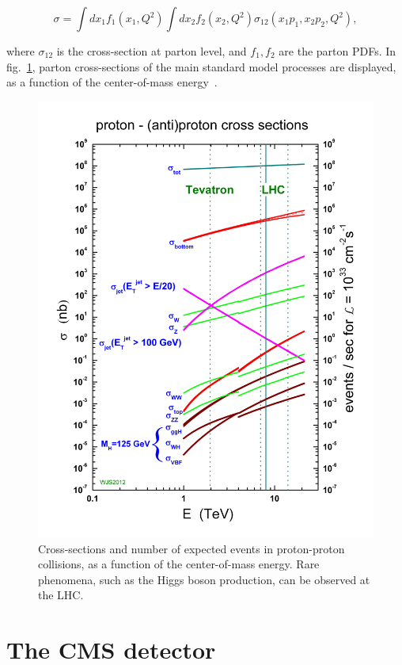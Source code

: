 \begin{equation}
\sigma = \int dx_1 f_1(x_1,Q^2) \int dx_2 f_2(x_2,Q^2) \sigma_{12}(x_1 p_1, x_2 p_2, Q^2),
\end{equation}

\noindent where $\sigma_{12}$ is the cross-section at parton level, and $f_1,f_2$ are the parton PDFs. In fig.~\ref{fig:LHC_pp_cross_section}, parton cross-sections of the main standard model processes are displayed, as a function of the center-of-mass energy~\cite{Moch:2008dt}.

\begin{figure}[!htb]
  \centering
    \includegraphics[width=.45\textwidth]{figures/crosssections2013.jpg}
  \caption{Cross-sections and number of expected events in proton-proton collisions, as a function of the center-of-mass energy. Rare phenomena, such as the Higgs boson production, can be observed at the LHC.~\cite{Moch:2008dt}}
  \label{fig:LHC_pp_cross_section}
\end{figure}

\section{The CMS detector}

